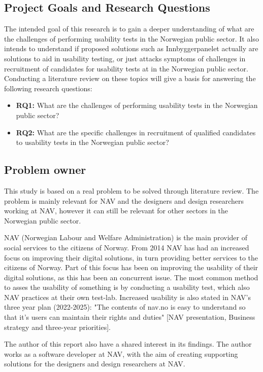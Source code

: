 \subsection{Project Goals and Research Questions}
The intended goal of this research is to gain a deeper understanding of what are the challenges of performing usability tests in the Norwegian public sector. It also intends to understand if proposed solutions such as Innbyggerpanelet actually are solutions to aid in usability testing, or just attacks symptoms of challenges in recruitment of candidates for usability tests at in the Norwegian public sector. Conducting a literature review on these topics will give a basis for answering the following research questions: 

\begin{itemize}
    \item \textbf{RQ1:} What are the challenges of performing usability tests in the Norwegian public sector?
    \item \textbf{RQ2:} What are the specific challenges in recruitment of qualified candidates to usability tests in the Norwegian public sector?
\end{itemize}


\subsection{Problem owner}
This study is based on a real problem to be solved through literature review. The problem is mainly relevant for NAV and the designers and design researchers working at NAV, however it can still be relevant for other sectors in the Norwegian public sector.

NAV (Norwegian Labour and Welfare Administration) is the main provider of social services to the citizens of Norway. From 2014 NAV has had an increased focus on improving their digital solutions, in turn providing better services to the citizens of Norway. Part of this focus has been on improving the usability of their digital solutions, as this has been an concurrent issue. The most common method to asses the usability of something is by conducting a usability test, which also NAV practices at their own test-lab. Increased usability is also stated in NAV's three year plan (2022-2025): "The contents of nav.no is easy to understand so that it's users can maintain their rights and duties" [NAV presentation, Business strategy and three-year priorities].

The author of this report also have a shared interest in its findings. The author works as a software developer at NAV, with the aim of creating supporting solutions for the designers and design researchers at NAV.

